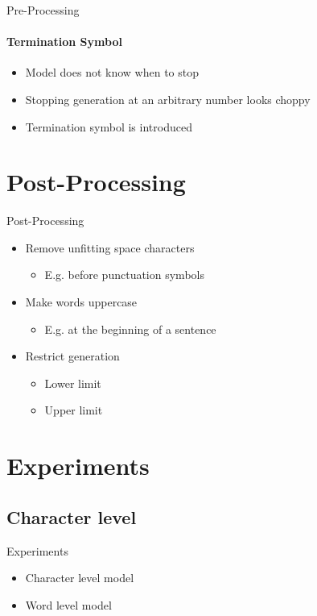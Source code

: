 \documentclass{beamer}
\begin{document}
\begin{frame}{Pre-Processing}
\framesubtitle{Termination Symbol}
\begin{itemize}
\item Model does not know when to stop
\vspace{3mm}
\item Stopping generation at an arbitrary number looks choppy
\vspace{3mm}
\item Termination symbol is introduced
\end{itemize}
\end{frame}

\section{Post-Processing}

\begin{frame}{Post-Processing}
\begin{itemize}
\item Remove unfitting space characters
	\begin{itemize}
	\item E.g. before punctuation symbols
	\end{itemize}
\vspace{3mm}
\item<2-> Make words uppercase
	\begin{itemize}
	\item E.g. at the beginning of a sentence
	\end{itemize}
\vspace{3mm}
\item<3-> Restrict generation
	\begin{itemize}
	\item Lower limit
	\item Upper limit
	\end{itemize}
\end{itemize}
\end{frame}

\section{Experiments}

\subsection{Character level}

\begin{frame}{Experiments}
\begin{itemize}
\item Character level model
\vspace{3mm}
\item Word level model
\end{itemize}
\end{frame}
\end{document}
